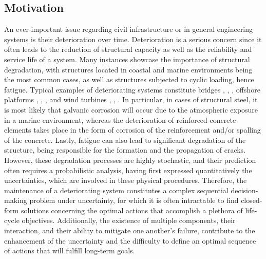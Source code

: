 

\subsection{Motivation}

An ever-important issue regarding civil infrastructure or in general engineering systems is their deterioration over time. Deterioration is a serious concern since it often leads to the reduction of structural capacity as well as the reliability and service life of a system. Many instances showcase the importance of structural degradation, with structures located in coastal and marine environments being the most common cases, as well as structures subjected to cyclic loading, hence fatigue. Typical examples of deteriorating systems constitute bridges \cite{stewart1998time}, \cite{akgul2004lifetime}, \cite{val1998effect}, offshore platforms \cite{moan2005reliability}, \cite{lotsberg2016probabilistic}, \cite{wirsching1980fatigue}, and wind turbines \cite{schaumann2011special}, \cite{dong2012fatigue}, \cite{yeter2015fatigue}. In particular, in cases of structural steel, it is most likely that galvanic corrosion will occur due to the atmospheric exposure in a marine environment, whereas the deterioration of reinforced concrete elements takes place in the form of corrosion of the reinforcement and/or spalling of the concrete. Lastly, fatigue can also lead to significant degradation of the structure, being responsible for the formation and the propagation of cracks.\\

However, these degradation processes are highly stochastic, and their prediction often requires a probabilistic analysis, having first expressed quantitatively the uncertainties, which are involved in these physical procedures. Therefore, the maintenance of a deteriorating system constitutes a complex sequential decision-making problem under uncertainty, for which it is often intractable to find closed-form solutions concerning the optimal actions that accomplish a plethora of life-cycle objectives. Additionally, the existence of multiple components, their interaction, and their ability to mitigate one another's failure, contribute to the enhancement of the uncertainty and the difficulty to define an optimal sequence of actions that will fulfill long-term goals.\\

